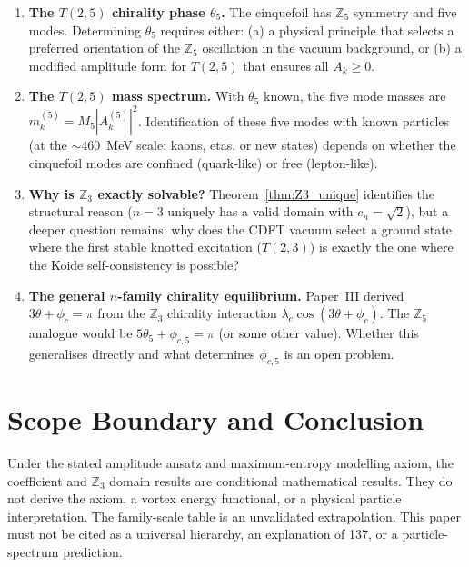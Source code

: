 \documentclass[11pt]{article}
\begin{document}
\begin{enumerate}

\item \textbf{The $T(2,5)$ chirality phase $\theta_5$.}
  The cinquefoil has $\mathbb{Z}_5$ symmetry and five modes.
  Determining $\theta_5$ requires either:
  (a) a physical principle that selects a preferred orientation of the
  $\mathbb{Z}_5$ oscillation in the vacuum background, or
  (b) a modified amplitude form for $T(2,5)$ that ensures all $A_k \geq 0$.

\item \textbf{The $T(2,5)$ mass spectrum.}
  With $\theta_5$ known, the five mode masses are
  $m_k^{(5)} = M_5 |A_k^{(5)}|^2$.
  Identification of these five modes with known particles
  (at the $\sim 460$~MeV scale: kaons, etas, or new states)
  depends on whether the cinquefoil modes are confined (quark-like)
  or free (lepton-like).

\item \textbf{Why is $\mathbb{Z}_3$ exactly solvable?}
  Theorem~\ref{thm:Z3_unique} identifies the structural reason
  ($n = 3$ uniquely has a valid domain with $c_n = \sqrt{2}$),
  but a deeper question remains: why does the CDFT vacuum select
  a ground state where the first stable knotted excitation ($T(2,3)$)
  is exactly the one where the Koide self-consistency is possible?

\item \textbf{The general $n$-family chirality equilibrium.}
  Paper~III derived $3\theta + \phi_c = \pi$ from the $\mathbb{Z}_3$
  chirality interaction $\lambda_c \cos(3\theta + \phi_c)$.
  The $\mathbb{Z}_5$ analogue would be $5\theta_5 + \phi_{c,5} = \pi$
  (or some other value).
  Whether this generalises directly and what determines $\phi_{c,5}$
  is an open problem.

\end{enumerate}


\section{Scope Boundary and Conclusion}

Under the stated amplitude ansatz and maximum-entropy modelling axiom, the
coefficient and $\mathbb{Z}_3$ domain results are conditional mathematical
results. They do not derive the axiom, a vortex energy functional, or a physical
particle interpretation. The family-scale table is an unvalidated extrapolation.
This paper must not be cited as a universal hierarchy, an explanation of 137,
or a particle-spectrum prediction.
\end{document}
